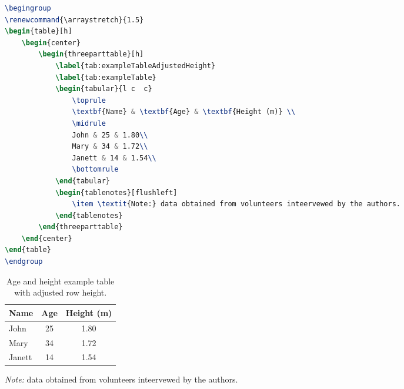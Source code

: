 \begin{lstlisting}[caption = {Example table with limited caption width and notes. (table \ref{tab:exampleTableAdjustedHeight})}, label = {lst:exampleTableAdjustedHeight}, style = prettyListing, language = tex]
\begingroup
\renewcommand{\arraystretch}{1.5}
\begin{table}[h]
	\begin{center}
		\begin{threeparttable}[h]
			\label{tab:exampleTableAdjustedHeight}
			\label{tab:exampleTable}
			\begin{tabular}{l c  c}
				\toprule
				\textbf{Name} & \textbf{Age} & \textbf{Height (m)} \\
				\midrule
				John & 25 & 1.80\\
				Mary & 34 & 1.72\\
				Janett & 14 & 1.54\\
				\bottomrule
			\end{tabular}
			\begin{tablenotes}[flushleft]
				\item \textit{Note:} data obtained from volunteers inteervewed by the authors.
			\end{tablenotes}
		\end{threeparttable}
	\end{center}
\end{table}
\endgroup
\end{lstlisting}

\begingroup
\renewcommand{\arraystretch}{1.5}
\begin{table}[h]
	\begin{center}
		\begin{threeparttable}[h]
			\caption{Age and height example table with adjusted row height.}
			\label{tab:exampleTableAdjustedHeight}
			\begin{tabular}{l c c}
				\toprule
				\textbf{Name} & \textbf{Age} & \textbf{Height (m)} \\
				\midrule
				John & 25 & 1.80\\
				Mary & 34 & 1.72\\
				Janett & 14 & 1.54\\
				\bottomrule
			\end{tabular}
			\begin{tablenotes}[flushleft]
				\item \textit{Note:} data obtained from volunteers inteervewed by the authors.
			\end{tablenotes}
		\end{threeparttable}
	\end{center}
\end{table}
\endgroup

